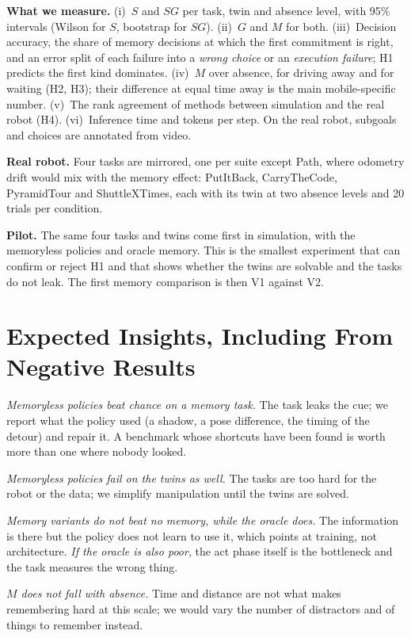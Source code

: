 \documentclass[conference]{IEEEtran}
\newcommand{\SG}{\mathit{SG}}
\begin{document}
\textbf{What we measure.} (i)~$S$ and $\SG$ per task, twin and absence level, with 95\% intervals (Wilson for $S$, bootstrap for $\SG$). (ii)~$G$ and $M$ for both. (iii)~Decision accuracy, the share of memory decisions at which the first commitment is right, and an error split of each failure into a \emph{wrong choice} or an \emph{execution failure}; H1 predicts the first kind dominates. (iv)~$M$ over absence, for driving away and for waiting (H2, H3); their difference at equal time away is the main mobile-specific number. (v)~The rank agreement of methods between simulation and the real robot (H4). (vi)~Inference time and tokens per step. On the real robot, subgoals and choices are annotated from video.

\textbf{Real robot.} Four tasks are mirrored, one per suite except Path, where odometry drift would mix with the memory effect: PutItBack, CarryTheCode, PyramidTour and ShuttleXTimes, each with its twin at two absence levels and 20 trials per condition.

\textbf{Pilot.} The same four tasks and twins come first in simulation, with the memoryless policies and oracle memory. This is the smallest experiment that can confirm or reject H1 and that shows whether the twins are solvable and the tasks do not leak. The first memory comparison is then V1 against V2.

\section{Expected Insights, Including From Negative Results}
\label{sec:insights}

\emph{Memoryless policies beat chance on a memory task.} The task leaks the cue; we report what the policy used (a shadow, a pose difference, the timing of the detour) and repair it. A benchmark whose shortcuts have been found is worth more than one where nobody looked.

\emph{Memoryless policies fail on the twins as well.} The tasks are too hard for the robot or the data; we simplify manipulation until the twins are solved.

\emph{Memory variants do not beat no memory, while the oracle does.} The information is there but the policy does not learn to use it, which points at training, not architecture. \emph{If the oracle is also poor}, the act phase itself is the bottleneck and the task measures the wrong thing.

\emph{$M$ does not fall with absence.} Time and distance are not what makes remembering hard at this scale; we would vary the number of distractors and of things to remember instead.
\end{document}
